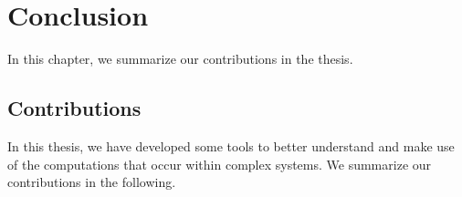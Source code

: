 \chapter{Conclusion}\label{cha:conclusion}

In this chapter, we summarize our contributions in the thesis.
%
\section{Contributions}

In this thesis, we have developed some tools to better understand and make use
of the computations that occur within complex systems.
We summarize our contributions in the following.

